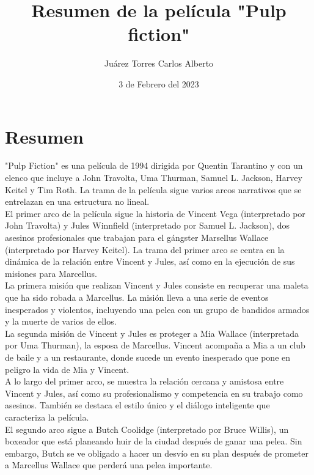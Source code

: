 \documentclass{article}
\title{Resumen de la película "Pulp fiction"}
\author{Juárez Torres Carlos Alberto}
\date{3 de Febrero del 2023}
\begin{document}
\maketitle

\section*{Resumen}

"Pulp Fiction" es una película de 1994 dirigida por Quentin Tarantino y con un elenco que incluye a John Travolta, Uma Thurman, Samuel L. Jackson, Harvey Keitel y Tim Roth. La trama de la película sigue varios arcos narrativos que se entrelazan en una estructura no lineal.\\

 El primer arco de la película sigue la historia de Vincent Vega (interpretado por John Travolta) y Jules Winnfield (interpretado por Samuel L. Jackson), dos asesinos profesionales que trabajan para el gángster Marsellus Wallace (interpretado por Harvey Keitel). La trama del primer arco se centra en la dinámica de la relación entre Vincent y Jules, así como en la ejecución de sus misiones para Marcellus.\\

 La primera misión que realizan Vincent y Jules consiste en recuperar una maleta que ha sido robada a Marcellus. La misión lleva a una serie de eventos inesperados y violentos, incluyendo una pelea con un grupo de bandidos armados y la muerte de varios de ellos.\\

La segunda misión de Vincent y Jules es proteger a Mia Wallace (interpretada por Uma Thurman), la esposa de Marcellus. Vincent acompaña a Mia a un club de baile y a un restaurante, donde sucede un evento inesperado que pone en peligro la vida de Mia y Vincent.\\

A lo largo del primer arco, se muestra la relación cercana y amistosa entre Vincent y Jules, así como su profesionalismo y competencia en su trabajo como asesinos. También se destaca el estilo único y el diálogo inteligente que caracteriza la película.\\

El segundo arco sigue a Butch Coolidge (interpretado por Bruce Willis), un boxeador que está planeando huir de la ciudad después de ganar una pelea. Sin embargo, Butch se ve obligado a hacer un desvío en su plan después de prometer a Marcellus Wallace que perderá una pelea importante.\\
\end{document}
